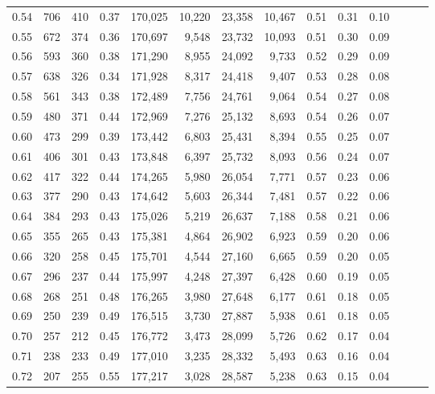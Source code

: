 \begin{tabular}{rrrrrrrrrrrrrr}
0.54 &    706 &  410 &  0.37 &  170,025 &   10,220 &  23,358 &  10,467 &  0.51 &  0.31 &      0.10 \\
0.55 &    672 &  374 &  0.36 &  170,697 &    9,548 &  23,732 &  10,093 &  0.51 &  0.30 &      0.09 \\
0.56 &    593 &  360 &  0.38 &  171,290 &    8,955 &  24,092 &   9,733 &  0.52 &  0.29 &      0.09 \\
0.57 &    638 &  326 &  0.34 &  171,928 &    8,317 &  24,418 &   9,407 &  0.53 &  0.28 &      0.08 \\
0.58 &    561 &  343 &  0.38 &  172,489 &    7,756 &  24,761 &   9,064 &  0.54 &  0.27 &      0.08 \\
0.59 &    480 &  371 &  0.44 &  172,969 &    7,276 &  25,132 &   8,693 &  0.54 &  0.26 &      0.07 \\
0.60 &    473 &  299 &  0.39 &  173,442 &    6,803 &  25,431 &   8,394 &  0.55 &  0.25 &      0.07 \\
0.61 &    406 &  301 &  0.43 &  173,848 &    6,397 &  25,732 &   8,093 &  0.56 &  0.24 &      0.07 \\
0.62 &    417 &  322 &  0.44 &  174,265 &    5,980 &  26,054 &   7,771 &  0.57 &  0.23 &      0.06 \\
0.63 &    377 &  290 &  0.43 &  174,642 &    5,603 &  26,344 &   7,481 &  0.57 &  0.22 &      0.06 \\
0.64 &    384 &  293 &  0.43 &  175,026 &    5,219 &  26,637 &   7,188 &  0.58 &  0.21 &      0.06 \\
0.65 &    355 &  265 &  0.43 &  175,381 &    4,864 &  26,902 &   6,923 &  0.59 &  0.20 &      0.06 \\
0.66 &    320 &  258 &  0.45 &  175,701 &    4,544 &  27,160 &   6,665 &  0.59 &  0.20 &      0.05 \\
0.67 &    296 &  237 &  0.44 &  175,997 &    4,248 &  27,397 &   6,428 &  0.60 &  0.19 &      0.05 \\
0.68 &    268 &  251 &  0.48 &  176,265 &    3,980 &  27,648 &   6,177 &  0.61 &  0.18 &      0.05 \\
0.69 &    250 &  239 &  0.49 &  176,515 &    3,730 &  27,887 &   5,938 &  0.61 &  0.18 &      0.05 \\
0.70 &    257 &  212 &  0.45 &  176,772 &    3,473 &  28,099 &   5,726 &  0.62 &  0.17 &      0.04 \\
0.71 &    238 &  233 &  0.49 &  177,010 &    3,235 &  28,332 &   5,493 &  0.63 &  0.16 &      0.04 \\
0.72 &    207 &  255 &  0.55 &  177,217 &    3,028 &  28,587 &   5,238 &  0.63 &  0.15 &      0.04 \\

\end{tabular}
